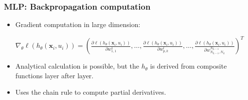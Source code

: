 \begin{frame}
\begin{textblock}{50}
\begin{center}
    \end{center}
  \end{textblock}
\end{frame}

\begin{frame}
  \frametitle{\acl{MLP}: Backpropagation computation}
  \begin{itemize}
    \item Gradient computation in large dimension:
    
    $
    \nabla_\theta \ell(h_{\theta}( \mathbf{x}_i, u_i)) = 
    \left( \frac{\partial \ell(h_{\theta}( \mathbf{x}_i, u_i)) }{\partial w_{1,1}^1},\ldots,\frac{\partial \ell(h_{\theta}( \mathbf{x}_i, u_i)) }{\partial w_{p,k}^l},\ldots,\frac{\partial \ell(h_{\theta}( \mathbf{x}_i, u_i)) }{\partial w_{N_{L-1},N_{L}}^{N_{L-1}}} \right)^T
    $


    \item Analytical calculation is possible, but the $h_{\theta}$ is derived from composite functions layer after layer.
    \item Uses the chain rule to compute partial derivatives.

  \end{itemize}

  
\end{frame}

